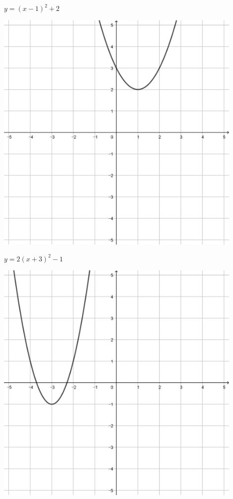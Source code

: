 \documentclass[a4paper]{oblivoir}
\begin{document}
\clearpage
\begin{minipage}{0.45\textwidth}\centering
\(y=(x-1)^2+2\)
\par\bigskip\includegraphics[width=0.9\textwidth]{img/9-1}
\end{minipage}
\begin{minipage}{0.45\textwidth}\centering
\(y=2(x+3)^2-1\)
\par\bigskip\includegraphics[width=0.9\textwidth]{img/9-2}
\end{minipage}\bigskip\bigskip\par
\end{document}
